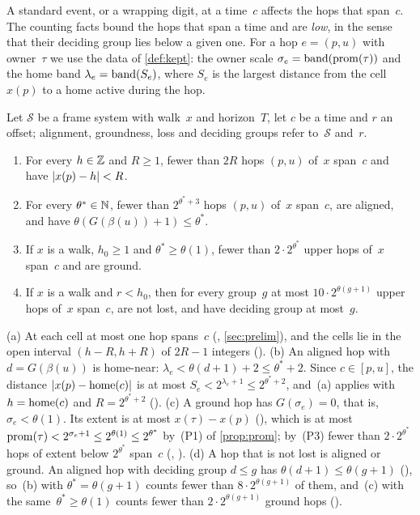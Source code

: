 A standard event, or a wrapping digit, at a time~$c$ affects the hops that span~$c$. The counting facts bound the hops that span a
time and are \emph{low}, in the sense that their deciding group lies below a given one. For a hop $e=(p,u)$ with owner~$\tau$ we
use the data of \cref{def:kept}: the owner scale $\sigma_e=\operatorname{band}(\operatorname{prom}(\tau))$ and the home band $\lambda_e=\operatorname{band}(S_e)$, where
$S_e$ is the largest distance from the cell $x(p)$ to a home active during the hop.

\begin{lemma}\label{lem:counting}
Let $\mathcal S$ be a frame system with walk~$x$ and horizon~$T$, let $c$ be a time and $r$ an offset; alignment, groundness,
loss and deciding groups refer to~$\mathcal S$ and~$r$.
\begin{enumerate}[label=(\alph*)]
\item For every $h\in\mathbb{Z}$ and $R\ge1$, fewer than $2R$ hops $(p,u)$ of~$x$ span~$c$ and have $\lvert x(p)-h \rvert<R$.
\item For every $\theta^*\in\mathbb{N}$, fewer than $2^{\theta^*+3}$ hops $(p,u)$ of~$x$ span~$c$, are aligned, and have
$\theta(G(\beta(u))+1)\le\theta^*$.
\item If $x$ is a walk, $h_0\ge1$ and $\theta^*\ge\theta(1)$, fewer than $2\cdot2^{\theta^*}$ upper hops of~$x$ span~$c$ and are
ground.
\item If $x$ is a walk and $r<h_0$, then for every group~$g$ at most $10\cdot2^{\theta(g+1)}$ upper hops of~$x$ span~$c$, are not
lost, and have deciding group at most~$g$.
\end{enumerate}
\end{lemma}

\begin{outline}
(a) At each cell at most one hop spans~$c$ (, \cref{sec:prelim}), and the cells lie in the open
interval $(h-R,h+R)$ of $2R-1$ integers (). (b) An aligned hop with $d=G(\beta(u))$ is home-near:
$\lambda_e<\theta(d+1)+2\le\theta^*+2$. Since $c\in[p,u]$, the distance $\lvert x(p)-\operatorname{home}(c) \rvert$ is at most $S_e<2^{\lambda_e+1}\le
2^{\theta^*+2}$, and~(a) applies with $h=\operatorname{home}(c)$ and $R=2^{\theta^*+2}$ (). (c) A ground hop has
$G(\sigma_e)=0$, that is, $\sigma_e<\theta(1)$. Its extent is at most $x(\tau)-x(p)$ (), which is at most
$\operatorname{prom}(\tau)<2^{\sigma_e+1}\le2^{\theta(1)}\le2^{\theta^*}$ by~(P1) of \cref{prop:prom}; by~(P3) fewer than $2\cdot2^{\theta^*}$ hops of
extent below $2^{\theta^*}$ span~$c$ (, ). (d) A hop that is not lost is
aligned or ground. An aligned hop with deciding group $d\le g$ has $\theta(d+1)\le\theta(g+1)$ (), so~(b) with
$\theta^*=\theta(g+1)$ counts fewer than $8\cdot2^{\theta(g+1)}$ of them, and~(c) with the same~$\theta^*\ge\theta(1)$ counts fewer
than $2\cdot2^{\theta(g+1)}$ ground hops ().
\end{outline}

